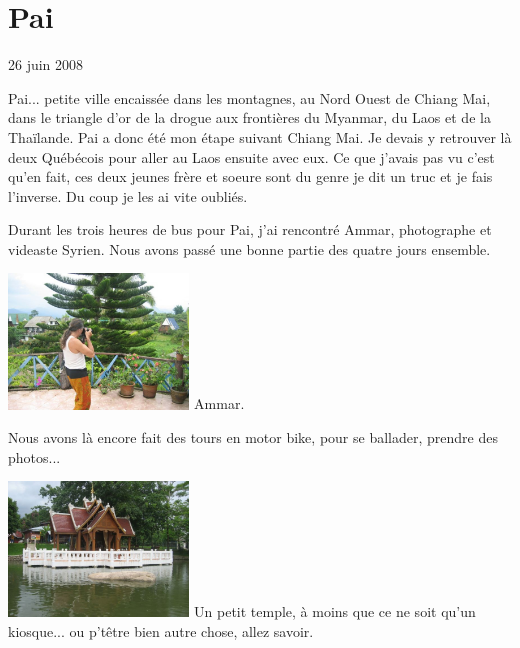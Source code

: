 \section{Pai}

26 juin 2008

\begin{multicols}{2}

Pai... petite ville encaissée dans les montagnes, au Nord Ouest de Chiang Mai, dans le triangle d'or de la drogue aux frontières du Myanmar, du Laos et de la Thaïlande. Pai a donc été mon étape suivant Chiang Mai. Je devais y retrouver là deux Québécois pour aller au Laos ensuite avec eux. Ce que j'avais pas vu c'est qu'en fait, ces deux jeunes frère et soeure sont du genre je dit un truc et je fais l'inverse. Du coup je les ai vite oubliés.

Durant les trois heures de bus pour Pai, j'ai rencontré Ammar, photographe et videaste Syrien. Nous avons passé une bonne partie des quatre jours ensemble.

\hspace*{-0.65cm}
\includegraphics[width=4.8cm]{articles/Pai/1214286262syiV.jpg}
Ammar.

Nous avons là encore fait des tours en motor bike, pour se ballader, prendre des photos...


\hspace*{-0.65cm}
\includegraphics[width=4.8cm]{articles/Pai/1214286159uUtC.jpg}
Un petit temple, à moins que ce ne soit qu'un kiosque... ou p'têtre bien autre chose, allez savoir.


\end{multicols}
